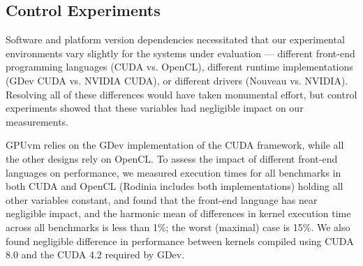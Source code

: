 
\subsection{Control Experiments}
\label{sec:control}

Software and platform version dependencies necessitated that our experimental environments vary slightly for the systems under evaluation ---
different front-end programming languages (CUDA vs. OpenCL), different runtime
implementations (GDev CUDA vs. NVIDIA CUDA), or different drivers (Nouveau vs. NVIDIA).
Resolving all of these differences would have taken monumental effort, but control experiments showed that these variables had negligible impact on our measurements.

 GPUvm relies on the GDev implementation of the
CUDA framework, while all the other designs rely on OpenCL. To assess the
impact of different front-end languages on performance, we measured execution
times for all benchmarks in both CUDA and OpenCL (Rodinia includes both
implementations) holding all other variables constant, and found that the
front-end language has near negligible impact, and the harmonic mean of
differences in kernel execution time across all benchmarks is less than 1\%;
the worst (maximal) case is 15\%.
We also found negligible difference in performance between kernels compiled using CUDA 8.0 and the CUDA 4.2 required by GDev.




